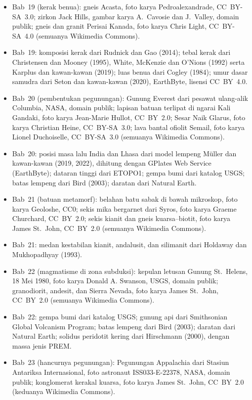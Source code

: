 \begin{itemize}
  \item Bab~19 (kerak benua): gneis Acasta, foto karya Pedroalexandrade, CC~BY-SA~3.0; zirkon Jack Hills, gambar karya A.~Cavosie dan J.~Valley, domain publik; gneis dan granit Perisai Kanada, foto karya Chris Light, CC~BY-SA~4.0 (semuanya Wikimedia Commons).
  \item Bab~19: komposisi kerak dari Rudnick dan Gao (2014); tebal kerak dari Christensen dan Mooney (1995), White, McKenzie dan O'Nions (1992) serta Karplus dan kawan-kawan (2019); luas benua dari Cogley (1984); umur dasar samudra dari Seton dan kawan-kawan (2020), EarthByte, lisensi CC~BY~4.0.
  \item Bab~20 (pembentukan pegunungan): Gunung Everest dari pesawat ulang-alik Columbia, NASA, domain publik; lapisan batuan terlipat di ngarai Kali Gandaki, foto karya Jean-Marie Hullot, CC~BY~2.0; Sesar Naik Glarus, foto karya Christian Heine, CC~BY-SA~3.0; lava bantal ofiolit Semail, foto karya Lionel Duchoiselle, CC~BY-SA~3.0 (semuanya Wikimedia Commons).
  \item Bab~20: posisi masa lalu India dan Lhasa dari model lempeng Müller dan kawan-kawan (2019, 2022), dihitung dengan GPlates Web Service (EarthByte); dataran tinggi dari ETOPO1; gempa bumi dari katalog USGS; batas lempeng dari Bird (2003); daratan dari Natural Earth.
  \item Bab~21 (batuan metamorf): belahan batu sabak di bawah mikroskop, foto karya Geoloshe, CC0; sekis mika bergarnet dari Syros, foto karya Graeme Churchard, CC~BY~2.0; sekis kianit dan gneis kuarsa--biotit, foto karya James St.~John, CC~BY~2.0 (semuanya Wikimedia Commons).
  \item Bab~21: medan kestabilan kianit, andalusit, dan silimanit dari Holdaway dan Mukhopadhyay (1993).
  \item Bab~22 (magmatisme di zona subduksi): kepulan letusan Gunung St.~Helens, 18 Mei 1980, foto karya Donald A. Swanson, USGS, domain publik; granodiorit, andesit, dan Sierra Nevada, foto karya James St.~John, CC~BY~2.0 (semuanya Wikimedia Commons).
  \item Bab~22: gempa bumi dari katalog USGS; gunung api dari Smithsonian Global Volcanism Program; batas lempeng dari Bird (2003); daratan dari Natural Earth; solidus peridotit kering dari Hirschmann (2000), dengan massa jenis PREM.
  \item Bab~23 (hancurnya pegunungan): Pegunungan Appalachia dari Stasiun Antariksa Internasional, foto astronaut ISS033-E-22378, NASA, domain publik; konglomerat kerakal kuarsa, foto karya James St.~John, CC~BY~2.0 (keduanya Wikimedia Commons).

\end{itemize}

